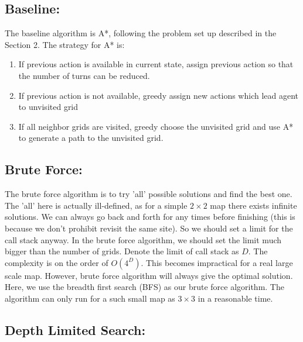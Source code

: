 \documentclass{article}
\begin{document}
\begin{normalsize}
            \subsection{Baseline:}
            
                The baseline algorithm is A*, following the problem set up described in the Section 2. The strategy for A* is:
                \begin{enumerate}
                    \item If previous action is available in current state, assign previous action so that the number of turns can be reduced.
                    \item If previous action is not available, greedy assign new actions which lead agent to unvisited grid
                    \item If all neighbor grids are visited, greedy choose the unvisited grid and use A* to generate a path to the unvisited grid.
                    
                    \end{enumerate}
            
            \subsection{Brute Force:}
            
                The brute force algorithm is to try 'all' possible solutions and find the best one. The 'all' here is actually ill-defined, as for a simple $2\times2$ map there exists infinite solutions. We can always go back and forth for any times before finishing (this is because we don't prohibit revisit the same site). So we should set a limit for the call stack anyway. In the brute force algorithm, we should set the limit much bigger than the number of grids. Denote the limit of call stack as $D$. The complexity is on the order of $O(4^D)$. This becomes impractical for a real large scale map. However, brute force algorithm will always give the optimal solution. Here, we use the breadth first search (BFS) as our brute force algorithm. The algorithm can only run for a such small map as $3\times3$ in a reasonable time.
                
            \subsection{Depth Limited Search:}
            

\end{normalsize}
\end{document}
